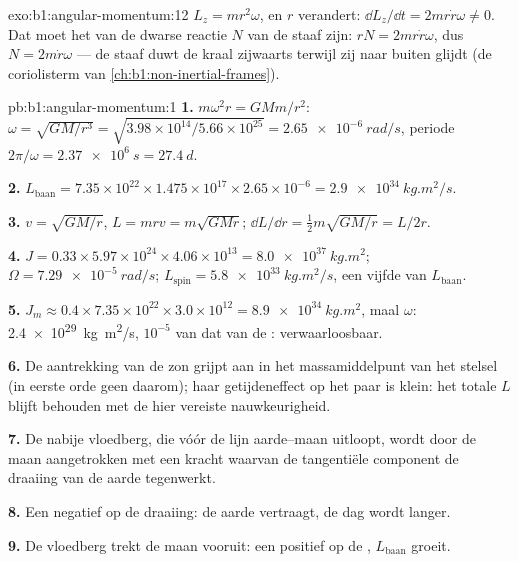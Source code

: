 \begin{solution}{exo:b1:angular-momentum:12}
$L_z = mr^2\omega$, en $r$ verandert: $\dd L_z/\dd t = 2mr\dot r\omega \neq 0$.
Dat moet het  van de dwarse reactie $N$ van de staaf zijn: $rN =
2mr\dot r\omega$, dus $N = 2m\dot r\omega$ --- de staaf duwt de kraal zijwaarts
terwijl zij naar buiten glijdt (de coriolisterm van \cref{ch:b1:non-inertial-frames}).
\end{solution}

\begin{solution}{pb:b1:angular-momentum:1}
\textbf{1.} $m\omega^2r = GMm/r^2$: $\omega = \sqrt{GM/r^3} = \sqrt{3.98\times
10^{14}/5.66\times10^{25}} = \qty{2.65e-6}{rad/s}$, periode $2\pi/\omega =
\qty{2.37e6}{s} = \qty{27.4}{d}$.

\textbf{2.} $L_{\text{baan}} = 7.35\times10^{22} \times 1.475\times10^{17}
\times 2.65\times10^{-6} = \qty{2.9e34}{kg.m^2/s}$.

\textbf{3.} $v = \sqrt{GM/r}$, $L = mrv = m\sqrt{GMr}$; $\dd L/\dd r =
\tfrac12 m\sqrt{GM/r} = L/2r$.

\textbf{4.} $J = 0.33 \times 5.97\times10^{24} \times 4.06\times10^{13} =
\qty{8.0e37}{kg.m^2}$; $\Omega = \qty{7.29e-5}{rad/s}$; $L_{\text{spin}} =
\qty{5.8e33}{kg.m^2/s}$, een vijfde van $L_{\text{baan}}$.

\textbf{5.} $J_m \approx 0.4 \times 7.35\times10^{22} \times 3.0\times10^{12} =
\qty{8.9e34}{kg.m^2}$, maal $\omega$: \qty{2.4e29}{kg.m^2/s}, $10^{-5}$ van
dat van de : verwaarloosbaar.

\textbf{6.} De aantrekking van de zon grijpt aan in het massamiddelpunt van het stelsel
(in eerste orde geen  daarom); haar getijdeneffect op het paar is
klein: het totale $L$ blijft behouden met de hier vereiste nauwkeurigheid.

\textbf{7.} De nabije vloedberg, die vóór de lijn aarde--maan uitloopt, wordt
door de maan aangetrokken met een kracht waarvan de tangentiële component de
draaiing van de aarde tegenwerkt.

\textbf{8.} Een negatief  op de draaiing: de aarde vertraagt, de dag
wordt langer.

\textbf{9.} De vloedberg trekt de maan vooruit: een positief  op de
, $L_{\text{baan}}$ groeit.


\end{solution}
